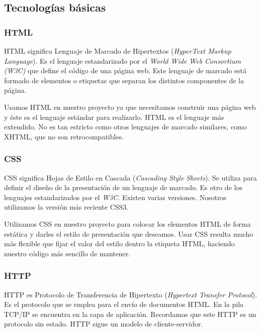 \subsection{Tecnologías básicas}

\subsubsection{HTML}
HTML significa Lenguaje de Marcado de Hipertextos (\textit{HyperText Markup Language}). Es el lenguaje estandarizado por el \textit{World Wide Web Consortium (W3C)} que define el código de una página web. Este lenguaje de marcado está formado de elementos o etiquetas que separan los distintos componentes de la página. \par

Usamos HTML en nuestro proyecto ya que necesitamos construir una página web y éste es el lenguaje estándar para realizarlo. HTML es el lenguaje más extendido. No es tan estricto como otros lenguajes de marcado similares, como XHTML, que no son retrocompatibles. \par

\subsubsection{CSS}
CSS significa Hojas de Estilo en Cascada (\textit{Cascading Style Sheets}). Se utiliza para definir el diseño de la presentación de un lenguaje de marcado. Es otro de los lenguajes estandarizados por el \textit{W3C}. Existen varias versiones. Nosotros utilizamos la versión más reciente CSS3. \par 

Utilizamos CSS en nuestro proyecto para colocar los elementos HTML de forma estática y darles el estilo de presentación que deseamos. Usar CSS resulta mucho más flexible que fijar el valor del estilo dentro la etiqueta HTML, haciendo nuestro código más sencillo de mantener. \par

\subsubsection{HTTP}
HTTP es Protocolo de Transferencia de Hipertexto (\textit{Hypertext Transfer Protocol}). Es el protocolo que se emplea para el envío de documentos HTML. En la pila TCP/IP se encuentra en la capa de aplicación. Recordamos que este HTTP es un protocolo sin estado. HTTP sigue un modelo de cliente-servidor.  \par

